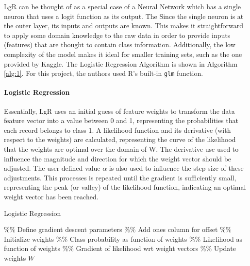 \documentclass[fleqn,10pt]{SelfArx} %
\begin{document}
LgR can be thought of as a special case of a Neural Network which has a single neuron that uses a logit function as its output.  The Since the single neuron is at the outer layer, its inputs and outputs are known.  This makes it straightforward to apply some domain knowledge to the raw data in order to provide inputs (features) that are thought to contain class information.  Additionally, the low complexity of the model makes it ideal for smaller training sets, such as the one provided by Kaggle. \cite{mccullagh} \cite{lim} The Logistic Regression Algorithm is shown in Algorithm \ref{alg:1}.  For this project, the authors used R's built-in \texttt{glm} function.

\paragraph{Logistic Regression} Essentially, LgR uses an initial guess of feature weights to transform the data feature vector into a value between 0 and 1, representing the probabilities that each record belongs to class 1.  A likelihood function and its derivative (with respect to the weights) are calculated, representing the curve of the likelihood that the weights are optimal over the domain of W.  The derivative use used to influence the magnitude and direction for which the weight vector should be adjusted.  The user-defined value $\alpha$ is also used to influence the step size of these adjustments.  This processes is repeated until the gradient is sufficiently small, representing the peak (or valley) of the likelihood function, indicating an optimal weight vector has been reached.

\begin{algorithm}
	\caption{Logistic Regression}
	\label{alg:2}
	\begin{algorithmic}[1]
		\STATE \%\% Define gradient descent parameters
		\STATE \%\% Add ones column for offset
		\STATE \%\% Initialize weights
		\STATE \%\% Class probability as function of weights
		\STATE \%\% Likelihood as function of weights
		\STATE \%\% Gradient of likelihood wrt weight vectors
		\STATE \%\% Update weights
		\ENDWHILE
		\RETURN $W$
	\end{algorithmic}
\end{algorithm}
\end{document}
